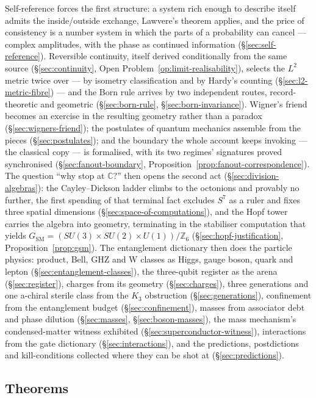 Self-reference forces the first structure: a system rich enough to describe itself admits the
inside/outside exchange, Lawvere's theorem applies, and the price of consistency is a number system
in which the parts of a probability can cancel --- complex amplitudes, with the phase as continued
information (\S\ref{sec:self-reference}). Reversible continuity, itself derived conditionally from
the same source (\S\ref{sec:continuity}, Open Problem~\ref{op:limit-realisability}), selects the
$L^{2}$ metric twice over --- by isometry classification and by Hardy's counting
(\S\ref{sec:l2-metric-fibre}) --- and the Born rule arrives by two independent routes, record-theoretic
and geometric (\S\ref{sec:born-rule}, \S\ref{sec:born-invariance}). Wigner's friend becomes an
exercise in the resulting geometry rather than a paradox (\S\ref{sec:wigners-friend}); the
postulates of quantum mechanics assemble from the pieces (\S\ref{sec:postulates}); and the boundary
the whole account keeps invoking --- the classical copy --- is formalised, with its two regimes'
signatures proved synchronised (\S\ref{sec:fanout-boundary},
Proposition~\ref{prop:fanout-correspondence}). The question ``why stop at $\mathbb{C}$?'' then opens
the second act (\S\ref{sec:division-algebras}): the Cayley--Dickson ladder climbs to the octonions
and provably no further, the first spending of that terminal fact excludes $S^{7}$ as a ruler and
fixes three spatial dimensions (\S\ref{sec:space-of-computations}), and the Hopf tower carries the
algebra into geometry, terminating in the stabiliser computation that yields
$G_{\mathrm{SM}} = (SU(3) \times SU(2) \times U(1))/\mathbb{Z}_{6}$
(\S\ref{sec:hopf-justification}, Proposition~\ref{prop:gsm}). The entanglement dictionary then
does the particle physics: product, Bell, GHZ and W classes as Higgs, gauge boson, quark and
lepton (\S\ref{sec:entanglement-classes}), the three-qubit register as the arena
(\S\ref{sec:register}), charges from its geometry (\S\ref{sec:charges}), three generations and one
a-chiral sterile class from the $K_3$ obstruction (\S\ref{sec:generations}), confinement from the
entanglement budget (\S\ref{sec:confinement}), masses from associator debt and phase dilution
(\S\ref{sec:masses}, \S\ref{sec:boson-masses}), the mass mechanism's condensed-matter
witness exhibited (\S\ref{sec:superconductor-witness}), interactions from the gate dictionary
(\S\ref{sec:interactions}), and the predictions, postdictions and kill-conditions collected where
they can be shot at (\S\ref{sec:predictions}).

\subsection{Theorems}

